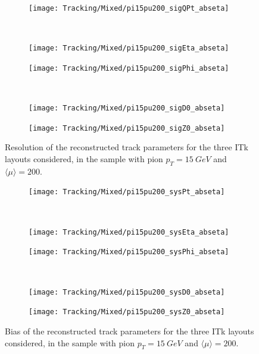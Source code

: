 \documentclass[a4paper,twoside,12pt]{book}
\begin{document}
\begin{figure}
\begin{subfigure}{\linewidth}
\centering
\texttt{[image: Tracking/Mixed/pi15pu200\_sigQPt\_abseta]}
\caption{}
\label{fig:tracking:pi15pu200_sigQPt_abseta}
\end{subfigure}\\[1ex]
\begin{subfigure}{.5\linewidth}
\texttt{[image: Tracking/Mixed/pi15pu200\_sigEta\_abseta]}
\caption{}
\label{fig:tracking:pi15pu200_sigEta_abseta}
\end{subfigure}
\begin{subfigure}{.5\linewidth}
\texttt{[image: Tracking/Mixed/pi15pu200\_sigPhi\_abseta]}
\caption{}
\label{fig:tracking:pi15pu200_sigPhi_abseta}
\end{subfigure}\\[1ex]
\begin{subfigure}{.5\linewidth}
\texttt{[image: Tracking/Mixed/pi15pu200\_sigD0\_abseta]}
\caption{}
\label{fig:tracking:pi15pu200_sigD0_abseta}
\end{subfigure}
\begin{subfigure}{.5\linewidth}
\texttt{[image: Tracking/Mixed/pi15pu200\_sigZ0\_abseta]}
\caption{}
\label{fig:tracking:pi15pu200_sigZ0_abseta}
\end{subfigure}
\caption{Resolution of the reconstructed track parameters for the three ITk layouts considered, in the sample with pion $p_{T} = 15\ GeV$ and $\langle\mu\rangle = 200$.}
\label{fig:tracking:pionResolution}
\end{figure}


\begin{figure}
\begin{subfigure}{\linewidth}
\texttt{[image: Tracking/Mixed/pi15pu200\_sysPt\_abseta]}
\centering
\caption{}
\label{fig:tracking:pi15pu200_sysPt_abseta}
\end{subfigure}\\[1ex]
\begin{subfigure}{.5\linewidth}
\texttt{[image: Tracking/Mixed/pi15pu200\_sysEta\_abseta]}
\caption{}
\label{fig:tracking:pi15pu200_sysEta_abseta}
\end{subfigure}
\begin{subfigure}{.5\linewidth}
\texttt{[image: Tracking/Mixed/pi15pu200\_sysPhi\_abseta]}
\caption{}
\label{fig:tracking:pi15pu200_sysPhi_abseta}
\end{subfigure}\\[1ex]
\begin{subfigure}{.5\linewidth}
\texttt{[image: Tracking/Mixed/pi15pu200\_sysD0\_abseta]}
\caption{}
\label{fig:tracking:pi15pu200_sysD0_abseta}
\end{subfigure}
\begin{subfigure}{.5\linewidth}
\texttt{[image: Tracking/Mixed/pi15pu200\_sysZ0\_abseta]}
\caption{}
\label{fig:tracking:pi15pu200_sysZ0_abseta}
\end{subfigure}
\caption{Bias of the reconstructed track parameters for the three ITk layouts considered, in the sample with pion $p_{T} = 15\ GeV$ and $\langle\mu\rangle = 200$.}
\label{fig:tracking:pionBias}
\end{figure}
\end{document}
